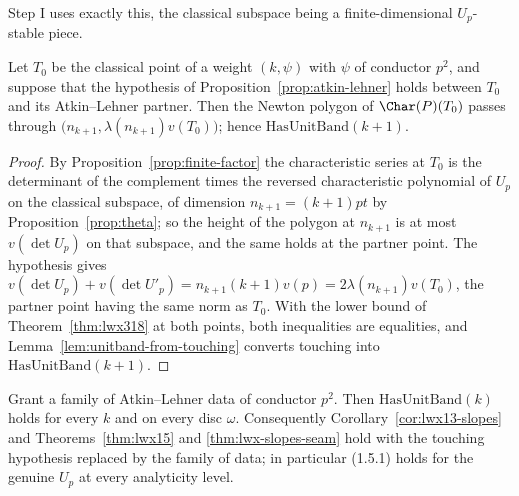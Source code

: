 Step I uses exactly this, the classical subspace being a finite-dimensional $U_p$-stable piece.

\begin{theorem}
  \label{thm:lwx-stepone}
  \leanok
  Let $T_0$ be the classical point of a weight $(k,\psi)$ with $\psi$ of conductor $p^{2}$, and
  suppose that the hypothesis of Proposition~\ref{prop:atkin-lehner} holds between $T_0$ and its
  Atkin--Lehner partner.  Then the Newton polygon of $\Char(P)(T_0)$ passes through
  $\bigl(n_{k+1}, \lambda(n_{k+1})v(T_0)\bigr)$; hence $\mathrm{HasUnitBand}(k+1)$.
\end{theorem}

\begin{proof}
  \leanok
  By Proposition~\ref{prop:finite-factor} the characteristic series at $T_0$ is the determinant of
  the complement times the reversed characteristic polynomial of $U_p$ on the classical subspace,
  of dimension $n_{k+1} = (k+1)pt$ by Proposition~\ref{prop:theta}; so the height of the polygon at
  $n_{k+1}$ is at most $v(\det U_p)$ on that subspace, and the same holds at the partner point.
  The hypothesis gives $v(\det U_p) + v(\det U'_p) = n_{k+1}(k+1)v(p) = 2\lambda(n_{k+1})v(T_0)$,
  the partner point having the same norm as $T_0$.  With the lower bound of
  Theorem~\ref{thm:lwx318} at both points, both inequalities are equalities, and
  Lemma~\ref{lem:unitband-from-touching} converts touching into $\mathrm{HasUnitBand}(k+1)$.
\end{proof}

\begin{theorem}
  \label{thm:lwx-unitband}
  \leanok
  Grant a family of Atkin--Lehner data of conductor $p^{2}$.  Then $\mathrm{HasUnitBand}(k)$ holds
  for every $k$ and on every disc $\omega$.  Consequently Corollary~\ref{cor:lwx13-slopes} and
  Theorems~\ref{thm:lwx15} and \ref{thm:lwx-slopes-seam} hold with the touching hypothesis replaced
  by the family of data; in particular (1.5.1) holds for the genuine $U_p$ at every analyticity
  level.
\end{theorem}

